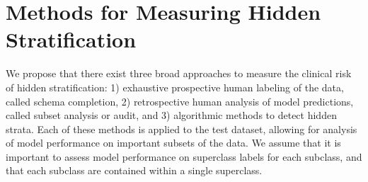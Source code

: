 \documentclass{article}
\begin{document}

\section{Methods for Measuring Hidden Stratification}
We propose that there exist three broad approaches to measure the clinical risk of hidden stratification: 1) exhaustive prospective human labeling of the data, called schema completion, 2) retrospective human analysis of model predictions, called subset analysis or audit, and 3) algorithmic methods to detect hidden strata. Each of these methods is applied to the test dataset, allowing for analysis of model performance on important subsets of the data.  We assume that it is important to assess model performance on superclass labels for each subclass, and that each subclass are contained within a single superclass. 
\end{document}
